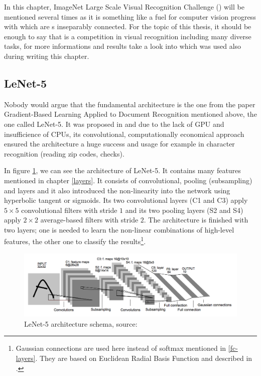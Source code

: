 In this chapter, ImageNet Large Scale Visual Recognition Challenge () 
will be mentioned several times as it is something like a fuel for computer 
vision progress with which are s inseparably connected. For the topic of 
this thesis, it should be enough to say that  is a competition in 
visual recognition including many diverse tasks, for more informations and 
results take a look into \cite{ILSVRC} which was used also during writing this 
chapter.

\subsection{LeNet-5} %
\label{lenet}

Nobody would argue that the fundamental architecture is the one from the paper 
Gradient-Based Learning Applied to Document Recognition mentioned above, the one 
called LeNet-5. It was proposed in \cite{lenet5} and due to the lack of GPU and 
insufficience of CPUs, its convolutional, computationally economical approach 
ensured the architecture a huge success and usage for example in character 
recognition (reading zip codes, checks). 

In figure \ref{fig:lenet}, we can see the architecture of LeNet-5. It contains 
many features mentioned in chapter \ref{layers}. It consists of convolutional, 
pooling (subsampling) and  layers and it also introduced the 
non-linearity into the network using hyperbolic tangent or sigmoids. Its two 
convolutional layers (C1 and C3) apply $5 \times 5$ convolutional filters with 
stride $1$ and its two pooling layers (S2 and S4) apply $2 \times 2$ 
average-based filters with stride $2$. The architecture is finished with two 
 layers; one is needed to learn the non-linear combinations of high-level 
features, the other one to classify the results\footnote{Gaussian connections 
are used here instead of softmax mentioned in \ref{fc-layers}. They are based on 
Euclidean Radial Basis Function and described in \cite{lenet5}.}.

\begin{figure}[H]
   \centering
	\includegraphics[width=\linewidth]{./pictures/lenet.png}
	\caption[LeNet-5 architecture]{LeNet-5 architecture schema, source: 
\cite{lenet5}}
      \label{fig:lenet}
\end{figure}

